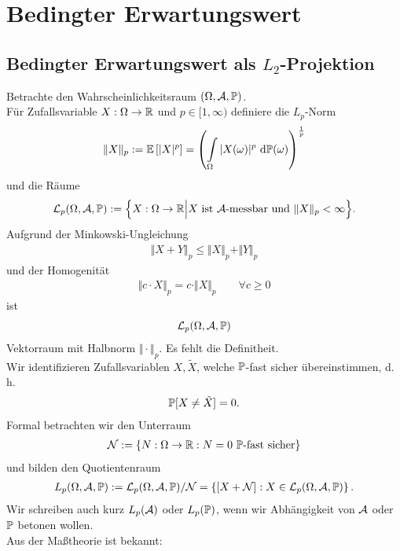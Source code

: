
\chapter{Bedingter Erwartungswert}
\section{Bedingter Erwartungswert als \texorpdfstring{$L_2$}{L\_2}-Projektion}
Betrachte den Wahrscheinlichkeitsraum $(\Omega,\A,\P)$.\\
Für Zufallsvariable $X:\Omega\to\R$ und $p\in[1,\infty)$ definiere die $L_p$-Norm
\begin{align*}
	\Vert X\Vert_p:=\E\left[|X|^p\right]=\left(\int\limits_\Omega|X(\omega)|^p\d\P(\omega)\right)^{\frac{1}{p}}
\end{align*}
und die Räume
\begin{align*}
	\mathcal{L}_p(\Omega,\A,\P):=\Big\lbrace X:\Omega\to\R\Big|X\text{ ist $\A$-messbar und }\Vert X\Vert_p<\infty\Big\rbrace.
\end{align*}
Aufgrund der Minkowski-Ungleichung
\begin{align*}
	\Vert X+Y\Vert_p\leq\Vert X\Vert_p+\Vert Y\Vert_p
\end{align*}
und der Homogenität
\begin{align*}
	\Vert c\cdot X\Vert_p=c\cdot\Vert X\Vert_p\qquad\forall c\geq0
\end{align*}
ist 
\begin{align*}
	\mathcal{L}_p(\Omega,\A,\P)
\end{align*}
Vektorraum mit Halbnorm $\Vert\cdot\Vert_p$. Es fehlt die Definitheit.\\
Wir identifizieren Zufallsvariablen $X,\tilde{X}$, welche $\P$-fast sicher übereinstimmen, d. h. 
\begin{align*}
	\P[X\neq\tilde{X}]=0.
\end{align*}
Formal betrachten wir den Unterraum
\begin{align*}
	\mathcal{N}:=\lbrace N:\Omega\to\R:N=0\text{ $\P$-fast sicher}\rbrace
\end{align*}
und bilden den Quotientenraum
\begin{align*}
	L_p(\Omega,\A,\P):=\mathcal{L}_p(\Omega,\A,\P)/\mathcal{N}=\left\lbrace[X+\mathcal{N}]:X\in\mathcal{L}_p(\Omega,\A,\P)\right\rbrace.
\end{align*}
Wir schreiben auch kurz $L_p(\A)$ oder $L_p(\P)$, wenn wir Abhängigkeit von $\A$ oder $\P$ betonen wollen.\\
Aus der Maßtheorie ist bekannt:

